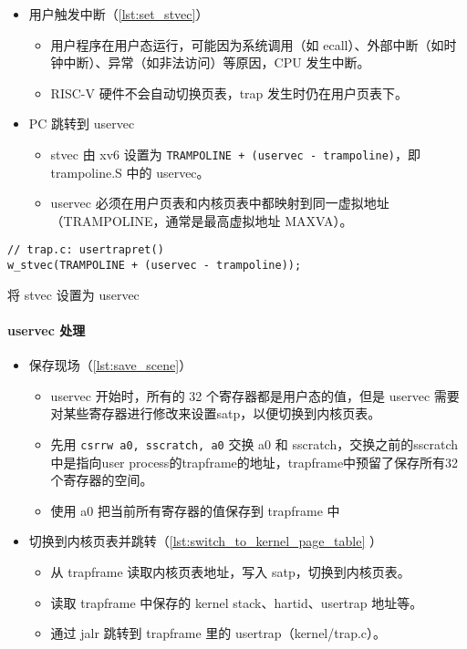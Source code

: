 \begin{itemize}
	\item 用户触发中断（\cref{lst:set_stvec}）
	\begin{itemize}
		\item 用户程序在用户态运行，可能因为系统调用（如 ecall）、外部中断（如时钟中断）、异常（如非法访问）等原因，CPU 发生中断。
		\item RISC-V 硬件不会自动切换页表，trap 发生时仍在用户页表下。
	\end{itemize}
	\item PC 跳转到 uservec
	\begin{itemize}
		\item stvec 由 xv6 设置为 \texttt{TRAMPOLINE + (uservec - trampoline)}，即 trampoline.S 中的 uservec。
		\item uservec 必须在用户页表和内核页表中都映射到同一虚拟地址（TRAMPOLINE，通常是最高虚拟地址 MAXVA）。
	\end{itemize}
\end{itemize}

\begin{listing}[!htb]
	\begin{verbatim}
// trap.c: usertrapret()
w_stvec(TRAMPOLINE + (uservec - trampoline));
	\end{verbatim}
	\caption{将 stvec 设置为 uservec}\label{lst:set_stvec}
\end{listing}

\paragraph{uservec 处理}

\begin{itemize}
	\item 保存现场（\cref{lst:save_scene}）
	\begin{itemize}
		\item uservec 开始时，所有的 32 个寄存器都是用户态的值，但是 uservec 需要对某些寄存器进行修改来设置satp，以便切换到内核页表。
		\item 先用 \texttt{csrrw a0, sscratch, a0} 交换 a0 和 sscratch，交换之前的sscratch中是指向user process的trapframe的地址，trapframe中预留了保存所有32个寄存器的空间。
		\item 使用 a0 把当前所有寄存器的值保存到 trapframe 中
	\end{itemize}
	\item 切换到内核页表并跳转（\cref{lst:switch_to_kernel_page_table} ）
	\begin{itemize}
		\item 从 trapframe 读取内核页表地址，写入 satp，切换到内核页表。
		\item 读取 trapframe 中保存的 kernel stack、hartid、usertrap 地址等。
		\item 通过 jalr 跳转到 trapframe 里的 usertrap（kernel/trap.c）。
	\end{itemize}
\end{itemize}

